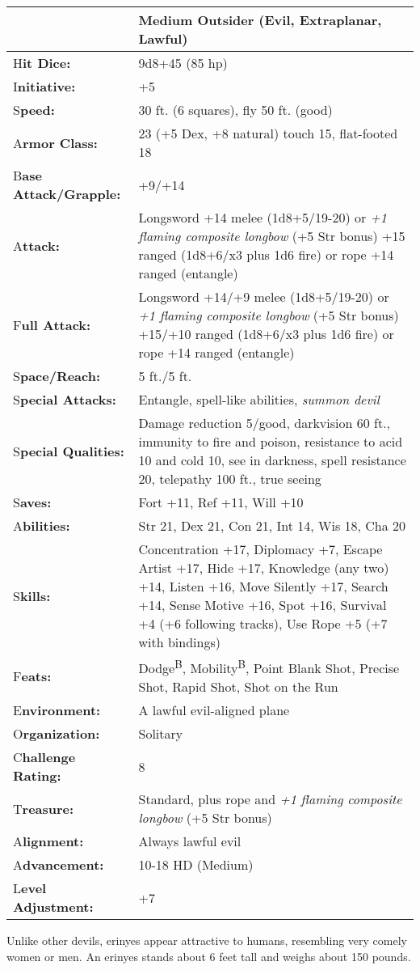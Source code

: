 \documentclass{article}
\begin{document}
\begin{tabular}{|>{\raggedright}p{91pt}|>{\raggedright}p{218pt}|}
\hline
  & Medium Outsider (Evil, Extraplanar, Lawful)\tabularnewline
\hline
H\textbf{it Dice:} & 9d8+45 (85 hp)\tabularnewline
\hline
I\textbf{nitiative:} & +5\tabularnewline
\hline
S\textbf{peed:} & 30 ft. (6 squares), fly 50 ft. (good)\tabularnewline
\hline
A\textbf{rmor Class:} & 23 (+5 Dex, +8 natural) touch 15, flat-footed 18\tabularnewline
\hline
B\textbf{ase Attack/Grapple:} & +9/+14\tabularnewline
\hline
A\textbf{ttack:} & Longsword +14 melee (1d8+5/19-20) or \textit{+1 flaming composite 
longbow }(+5 Str bonus) +15 ranged (1d8+6/x3 plus 1d6 fire) or rope +14 ranged 
(entangle)\tabularnewline
\hline
F\textbf{ull Attack:} & Longsword +14/+9 melee (1d8+5/19-20) or \textit{+1 flaming 
composite longbow }(+5 Str bonus) +15/+10 ranged (1d8+6/x3 plus 1d6 fire) or rope 
+14 ranged (entangle)\tabularnewline
\hline
S\textbf{pace/Reach:} & 5 ft./5 ft.\tabularnewline
\hline
S\textbf{pecial Attacks:} & Entangle, spell-like abilities, \textit{summon devil}\tabularnewline
\hline
S\textbf{pecial Qualities:} & Damage reduction 5/good, darkvision 60 ft., immunity 
to fire and poison, resistance to acid 10 and cold 10, see in darkness, spell resistance 
20, telepathy 100 ft., true seeing\tabularnewline
\hline
S\textbf{aves:} & Fort +11, Ref +11, Will +10\tabularnewline
\hline
A\textbf{bilities:} & Str 21, Dex 21, Con 21, Int 14, Wis 18, Cha 20\tabularnewline
\hline
S\textbf{kills:} & Concentration +17, Diplomacy +7, Escape Artist +17, Hide +17, 
Knowledge (any two) +14, Listen +16, Move Silently +17, Search +14, Sense Motive 
+16, Spot +16, Survival +4 (+6 following tracks), Use Rope +5 (+7 with bindings)\tabularnewline
\hline
F\textbf{eats:} & Dodge\textsuperscript{B}, Mobility\textsuperscript{B}, Point 
Blank Shot, Precise Shot, Rapid Shot, Shot on the Run\tabularnewline
\hline
E\textbf{nvironment:} & A lawful evil-aligned plane\tabularnewline
\hline
O\textbf{rganization:} & Solitary\tabularnewline
\hline
C\textbf{hallenge Rating:} & 8\tabularnewline
\hline
T\textbf{reasure:} & Standard, plus rope and \textit{+1 flaming composite longbow 
}(+5 Str bonus)\tabularnewline
\hline
A\textbf{lignment:} & Always lawful evil\tabularnewline
\hline
A\textbf{dvancement:} & 10-18 HD (Medium)\tabularnewline
\hline
L\textbf{evel Adjustment:} & +7\tabularnewline
\hline
\end{tabular}

Unlike other devils, erinyes appear attractive to humans, resembling very comely 
women or men. An erinyes stands about 6 feet tall and weighs about 150 pounds.
\end{document}
